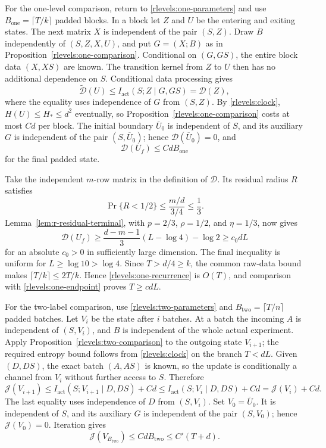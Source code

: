 For the one-level comparison, return to
\eqref{rlevels:one-parameters} and use
\(B_{\mathrm{one}}=\lceil T/k\rceil\) padded blocks.  In a block let \(Z\)
and \(U\) be the entering and exiting states.  The next matrix
\(X\) is independent of the pair \((S,Z)\).  Draw \(B\) independently
of \((S,Z,X,U)\), and put \(G=(X;B)\) as in Proposition~\ref{rlevels:one-comparison}.
Conditional on \((G,GS)\), the entire block data \((X,XS)\)
are known.  The transition kernel from \(Z\) to \(U\) then has no
additional dependence on \(S\).  Conditional data processing gives
\[
 \widetilde{\mathcal D}(U)
 \le I_{\mathrm{act}}(S;Z\mid G,GS)=\mathcal D(Z),
\]
where the equality uses independence of \(G\) from \((S,Z)\).
By \eqref{rlevels:clock}, \(H(U)\le H_*\le d^2\) eventually,
so Proposition~\ref{rlevels:one-comparison} costs at most \(Cd\)
per block.  The initial boundary \(\overline U_0\) is independent of
\(S\), and its auxiliary \(G\) is independent of the pair
\((S,\overline U_0)\); hence \(\mathcal D(\overline U_0)=0\), and
\begin{equation}\label{rlevels:one-recurrence}
 \mathcal D(U_f)\le CdB_{\mathrm{one}}
\end{equation}
for the final padded state.

Take the independent \(m\)-row matrix in the definition of
\(\mathcal D\).  Its residual radius \(R\) satisfies
\[
 \Pr\{R<1/2\}\le \frac{m/d}{3/4}\le\frac13.
\]
Lemma~\ref{lem:r-residual-terminal}, with
\(p=2/3\), \(\rho=1/2\), and \(\eta=1/3\), now gives
\begin{equation}\label{rlevels:one-endpoint}
 \mathcal D(U_f)
 \ge\frac{d-m-1}{3}(L-\log4)-\log2
 \ge c_0dL
\end{equation}
for an absolute \(c_0>0\) in sufficiently large dimension.
The final inequality is uniform for \(L\ge\log10>\log4\).
Since \(T>d/4\ge k\), the common raw-data bound makes
\(\lceil T/k\rceil\le2T/k\).  Hence
\eqref{rlevels:one-recurrence} is \(O(T)\), and comparison with
\eqref{rlevels:one-endpoint} proves \(T\ge cdL\).

For the two-label comparison, use
\eqref{rlevels:two-parameters} and
\(B_{\mathrm{two}}=\lceil T/n\rceil\) padded batches.  Let \(V_i\) be the
state after \(i\) batches.  At a batch the incoming \(A\) is
independent of \((S,V_i)\), and \(B\) is independent of the
whole actual experiment.  Apply Proposition~\ref{rlevels:two-comparison}
to the outgoing state \(V_{i+1}\); the required entropy bound follows
from \eqref{rlevels:clock} on the branch \(T<dL\).
Given \((D,DS)\), the exact batch \((A,AS)\) is known, so
the update is conditionally a channel from \(V_i\) without further
access to \(S\).  Therefore
\[
 \mathcal J(V_{i+1})
 \le I_{\mathrm{act}}(S;V_{i+1}\mid D,DS)+Cd
 \le I_{\mathrm{act}}(S;V_i\mid D,DS)+Cd
 =\mathcal J(V_i)+Cd.
\]
The last equality uses independence of \(D\) from \((S,V_i)\).
Set \(V_0=\overline U_0\).  It is independent of \(S\), and its
auxiliary \(G\) is independent of the pair \((S,V_0)\); hence
\(\mathcal J(V_0)=0\).  Iteration gives
\begin{equation}\label{rlevels:two-recurrence}
 \mathcal J(V_{B_{\mathrm{two}}})\le CdB_{\mathrm{two}}\le C'(T+d).
\end{equation}

